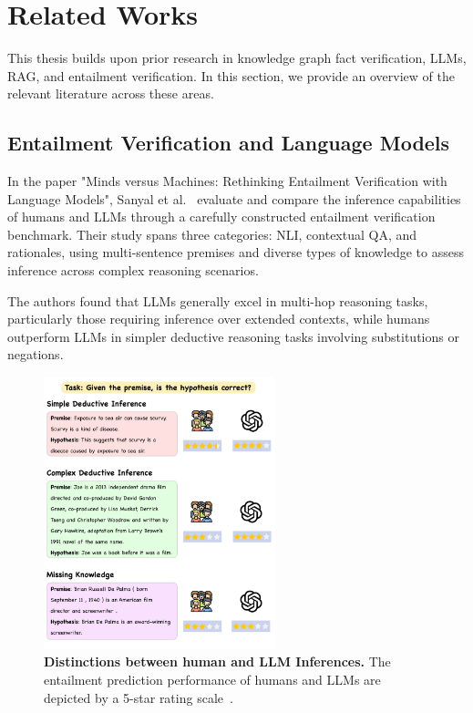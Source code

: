 \chapter{Related Works}\label{ch:related_works}
This thesis builds upon prior research in knowledge graph fact verification, \ac{LLMs}, \ac{RAG}, and entailment verification.
In this section, we provide an overview of the relevant literature across these areas.

\section{Entailment Verification and Language Models}\label{sec:entailment-verification}
In the paper "Minds versus Machines: Rethinking Entailment Verification with Language Models", Sanyal et al.~\cite{sanyal2024machinesbettercomplexreasoning} evaluate and compare the inference capabilities of humans and \ac{LLMs} through a carefully constructed entailment verification benchmark.
Their study spans three categories: \ac{NLI}, contextual \ac{QA}, and rationales, using multi-sentence premises and diverse types of knowledge to assess inference across complex reasoning scenarios.

The authors found that LLMs generally excel in multi-hop reasoning tasks, particularly those requiring inference over extended contexts, while humans outperform \ac{LLMs} in simpler deductive reasoning tasks involving substitutions or negations.


\begin{figure}[ht!]
    \centering
    \begin{minipage}[b]{\textwidth}
        \centering
        \includegraphics[width=0.6\textwidth]{res/rel-human-llm-inference}
        \caption{\textbf{Distinctions between human and LLM Inferences.} The entailment prediction performance of humans and LLMs are depicted by a 5-star rating scale~\cite{sanyal2024machinesbettercomplexreasoning}.}
        \label{fig:distinguishing-human-llm-inferences}
    \end{minipage}
\end{figure}

